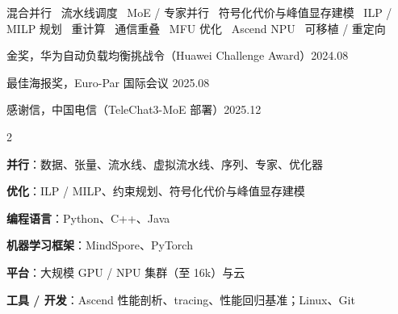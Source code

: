 \documentclass[a4paper,11pt]{article}
\begin{document}
\small 混合并行 \textperiodcentered\ 流水线调度 \textperiodcentered\ MoE / 专家并行 \textperiodcentered\ 符号化代价与峰值显存建模 \textperiodcentered\ ILP / MILP 规划 \textperiodcentered\ 重计算 \textperiodcentered\ 通信重叠 \textperiodcentered\ MFU 优化 \textperiodcentered\ Ascend NPU \textperiodcentered\ 可移植 / 重定向

\awardListStart
  \item \small 金奖，华为自动负载均衡挑战令（Huawei Challenge Award）\hfill 2024.08
  \item \small 最佳海报奖，Euro-Par 国际会议 \hfill 2025.08
  \item \small 感谢信，中国电信（TeleChat3-MoE 部署）\hfill 2025.12
\awardListEnd

\begin{multicols}{2}
\raggedright
\skillListStart
  \item \textbf{并行}：数据、张量、流水线、虚拟流水线、序列、专家、优化器
  \item \textbf{优化}：ILP / MILP、约束规划、符号化代价与峰值显存建模
  \item \textbf{编程语言}：Python、C++、Java
  \item \textbf{机器学习框架}：MindSpore、PyTorch
  \item \textbf{平台}：大规模 GPU / NPU 集群（至 16k）与云
  \item \textbf{工具 / 开发}：Ascend 性能剖析、tracing、性能回归基准；Linux、Git
\skillListEnd
\end{multicols}
\end{document}
